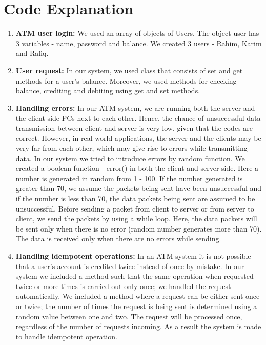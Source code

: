 \documentclass[11pt]{article}
\begin{document}
\section{Code Explanation}
\begin{enumerate}
    \item \textbf {ATM user login:} We used an array of objects of Users. The object user has 3 variables - name, password and balance. We created 3 users - Rahim, Karim and Rafiq.
    \item \textbf {User request:} In our system, we used class that consists of set and get methods for a user's balance. Moreover, we used methods for checking balance, crediting and debiting using get and set methods.
    \item \textbf {Handling errors:} In our ATM system, we are running both the server and the client side PCs next to each other. Hence, the chance of unsuccessful data transmission between client and server is very low, given that the codes are correct. However, in real world applications, the server and the clients may be very far from each other, which may give rise to errors while transmitting data. In our system we tried to introduce errors by random function. We created a boolean function -  error() in both the client and server side. Here a number is generated in random from 1 - 100. If the number generated is greater than 70, we assume the packets being sent have been unsuccessful and if the number is less than 70, the data packets being sent are assumed to be unsuccessful. Before sending a packet from client to server or from server to client, we send the packets by using a while loop. Here, the data packets will be sent only when there is no error (random number generates more than 70). The data is received only when there are no errors while sending.
    \item \textbf {Handling idempotent operations:} In an ATM system it is not possible that a user’s account is credited twice instead of once by mistake. In our system we included a method such that the same operation when requested twice or more times is carried out only once; we handled the request automatically. We included a method where a request can be either sent once or twice; the number of times the request is being sent is determined using a random value between one and two. The request will be processed once, regardless of the number of requests incoming. As a result the system is made to handle idempotent operation.
\end{enumerate}
\end{document}
